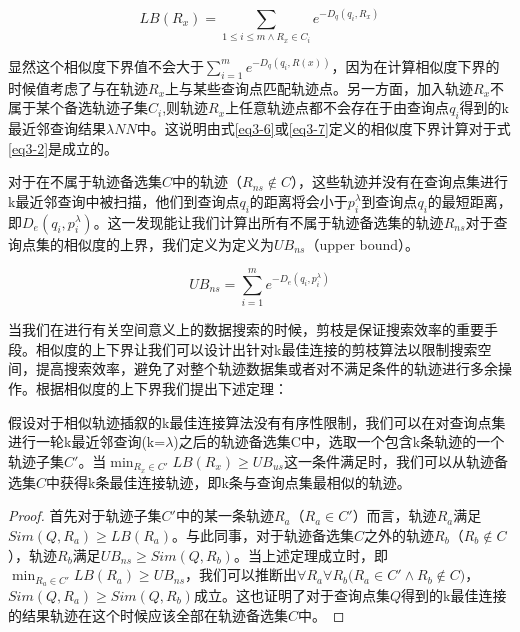 \begin{equation}
	\label{eq3-7}
	LB(R_{x}) = \sum_{1\leq i\leq m \wedge R_{x}\in C_{i}}e^{-D_{q}(q_{i}, R_{x})}
\end{equation} 

显然这个相似度下界值不会大于$\sum_{i=1}^{m} e^{-D_{q}(q_{i}, R(x))}$，因为在计算相似度下界的时候值考虑了与在轨迹$R_{x}$上与某些查询点匹配轨迹点。另一方面，加入轨迹$R_{x}$不属于某个备选轨迹子集$C_{i}$,则轨迹$R_{x}$上任意轨迹点都不会存在于由查询点$q_{i}$得到的k最近邻查询结果$\lambda NN$中。这说明由式\ref{eq3-6}或\ref{eq3-7}定义的相似度下界计算对于式\ref{eq3-2}是成立的。

对于在不属于轨迹备选集$C$中的轨迹（$R_{ns} \notin C$），这些轨迹并没有在查询点集进行k最近邻查询中被扫描，他们到查询点$q_{i}$的距离将会小于$p_{i}^{\lambda}$到查询点$q_{i}$的最短距离，即$D_{e}(q_{i}, p_{i}^{\lambda})$。这一发现能让我们计算出所有不属于轨迹备选集的轨迹$R_{ns}$对于查询点集的相似度的上界，我们定义为定义为$UB_{ns}$（upper bound）。

\begin{equation}
	\label{eq3-8}
	UB_{ns} = \sum_{i=1}^{m}e^{-D_{e}(q_{i}, p_{i}^{\lambda})}
\end{equation}

当我们在进行有关空间意义上的数据搜索的时候，剪枝是保证搜索效率的重要手段。相似度的上下界让我们可以设计出针对k最佳连接的剪枝算法以限制搜索空间，提高搜索效率，避免了对整个轨迹数据集或者对不满足条件的轨迹进行多余操作。根据相似度的上下界我们提出下述定理：
\\

\begin{thm}[相似度上下界]
	\label{thm3-1}
	假设对于相似轨迹插叙的k最佳连接算法没有有序性限制，我们可以在对查询点集进行一轮k最近邻查询(k=$\lambda$)之后的轨迹备选集C中，选取一个包含k条轨迹的一个轨迹子集$C'$。当$\min_{R_{x}\in C'}{LB(R_{x})}\geq UB_{us}$这一条件满足时，我们可以从轨迹备选集$C$中获得k条最佳连接轨迹，即k条与查询点集最相似的轨迹。
	\begin{proof}
	首先对于轨迹子集$C'$中的某一条轨迹$R_{a}$（$R_{a} \in C'$）而言，轨迹$R_{a}$满足$Sim(Q,R_{a}) \geq LB(R_{a})$。与此同事，对于轨迹备选集$C$之外的轨迹$R_{b}$（$R_{b} \notin C$），轨迹$R_{b}$满足$UB_{ns} \geq Sim(Q,R_{b})$。当上述定理成立时，即$\min_{R_{a}\in C'}{LB(R_{a})}\geq UB_{ns}$，我们可以推断出$\forall R_{a}\forall R_{b} \big( R_{a} \in C' \wedge R_{b} \notin C \big)$，$Sim(Q,R_{a}) \geq Sim(Q,R_{b})$成立。这也证明了对于查询点集$Q$得到的k最佳连接的结果轨迹在这个时候应该全部在轨迹备选集$C$中。
	\end{proof}
\end{thm}

